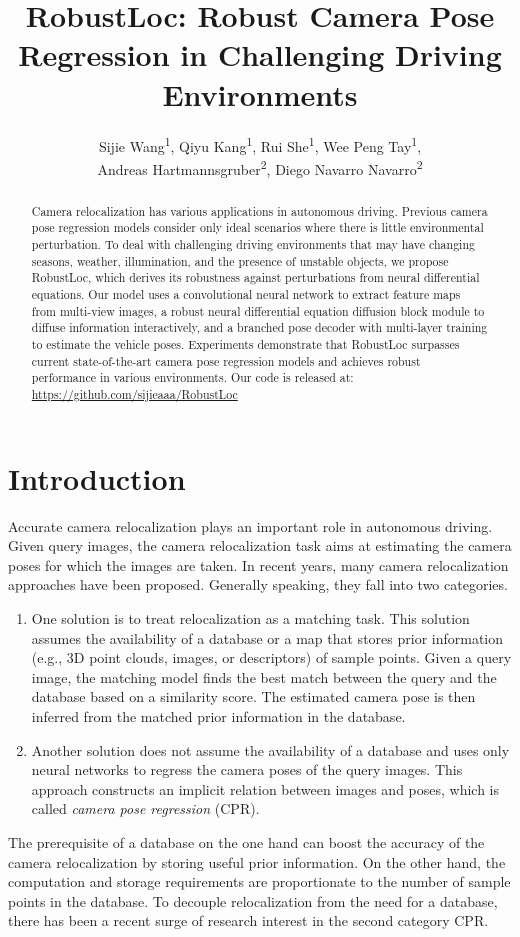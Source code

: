 \documentclass[letterpaper]{article} \usepackage{aaai23}  \usepackage{times}  \usepackage{helvet}  \usepackage{courier}  \usepackage[hyphens]{url}  \usepackage{graphicx} \urlstyle{rm} \def\UrlFont{\rm}  \usepackage{natbib}  \usepackage{caption} \frenchspacing  \setlength{\pdfpagewidth}{8.5in} \setlength{\pdfpageheight}{11in} \usepackage{booktabs}
\title{RobustLoc: Robust Camera Pose Regression in Challenging Driving Environments}
\author {
Sijie Wang\textsuperscript{\rm 1}\equalcontrib,
    Qiyu Kang\textsuperscript{\rm 1}\equalcontrib,
    Rui She\textsuperscript{\rm 1}\equalcontrib,
    Wee Peng Tay\textsuperscript{\rm 1}, \\
    Andreas Hartmannsgruber\textsuperscript{\rm 2},
    Diego Navarro Navarro\textsuperscript{\rm 2}
}
\theoremstyle{remark}
\theoremstyle{plain}
\begin{document}
\maketitle

\begin{abstract}
Camera relocalization has various applications in autonomous driving. Previous camera pose regression models consider only ideal scenarios where there is little environmental perturbation. To deal with challenging driving environments that may have changing seasons, weather, illumination, and the presence of unstable objects, we propose RobustLoc, which derives its robustness against perturbations from neural differential equations. Our model uses a convolutional neural network to extract feature maps from multi-view images, a robust neural differential equation diffusion block module to diffuse information interactively, and a branched pose decoder with multi-layer training to estimate the vehicle poses. Experiments demonstrate that RobustLoc surpasses current state-of-the-art camera pose regression models and achieves robust performance in various environments. Our code is released at: \url{https://github.com/sijieaaa/RobustLoc}
\end{abstract}

\section{Introduction}\label{sec:introduction}


Accurate camera relocalization plays an important role in autonomous driving.  Given query images, the camera relocalization task aims at estimating the camera poses for which the images are taken. In recent years, many camera relocalization approaches have been proposed. Generally speaking, they fall into two categories.
\begin{enumerate}
    \item One solution is to treat relocalization as a matching task. This solution assumes the availability of a database or a map that stores prior information (e.g., 3D point clouds, images, or descriptors) of sample points. Given a query image, the matching model finds the best match between the query and the database based on a similarity score. The estimated camera pose is then inferred from the matched prior information in the database.
\item Another solution does not assume the availability of a database and uses only neural networks to regress the camera poses of the query images. This approach constructs an implicit relation between images and poses, which is called \emph{camera pose regression} (CPR).
\end{enumerate}
The prerequisite of a database on the one hand can boost the accuracy of the camera relocalization by storing useful prior information. On the other hand, the computation and storage requirements are proportionate to the number of sample points in the database. To decouple relocalization from the need for a database, there has been a recent surge of research interest in the second category CPR. 
\end{document}
